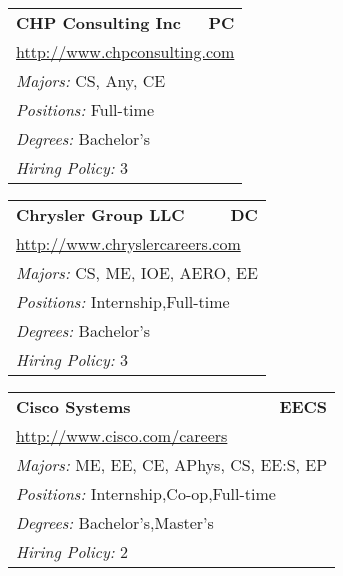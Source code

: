\documentclass[twoside]{article}
\begin{document}
\begin{center}
\begin{multicols}{3}
\begin{FlushLeft}
\begin{minipage}{.9\columnwidth}
\end{minipage}
 
\begin{minipage}{.9\columnwidth}\begin{tabularx}{.95\columnwidth}{Xr}
                 {\Large\bf CHP Consulting Inc} & {\Large\bf PC}\\
    \multicolumn{2}{p{.95\columnwidth}}{\url{http://www.chpconsulting.com}}\\
    \multicolumn{2}{p{.95\columnwidth}}{\emph{Majors:} CS, Any, CE}\\
    \multicolumn{2}{p{.95\columnwidth}}{\emph{Positions:} Full-time}\\
    \multicolumn{2}{p{.95\columnwidth}}{\emph{Degrees:} Bachelor's}\\
    \multicolumn{2}{p{.95\columnwidth}}{\emph{Hiring Policy:} 3}\\
    \end{tabularx}
    
\end{minipage}
 
\begin{minipage}{.9\columnwidth}\begin{tabularx}{.95\columnwidth}{Xr}
                 {\Large\bf Chrysler Group LLC} & {\Large\bf DC}\\
    \multicolumn{2}{p{.95\columnwidth}}{\url{http://www.chryslercareers.com}}\\
    \multicolumn{2}{p{.95\columnwidth}}{\emph{Majors:} CS, ME, IOE, AERO, EE}\\
    \multicolumn{2}{p{.95\columnwidth}}{\emph{Positions:} Internship,Full-time}\\
    \multicolumn{2}{p{.95\columnwidth}}{\emph{Degrees:} Bachelor's}\\
    \multicolumn{2}{p{.95\columnwidth}}{\emph{Hiring Policy:} 3}\\
    \end{tabularx}
    
\end{minipage}
 
\begin{minipage}{.9\columnwidth}\begin{tabularx}{.95\columnwidth}{Xr}
                 {\Large\bf Cisco Systems} & {\Large\bf EECS}\\
    \multicolumn{2}{p{.95\columnwidth}}{\url{http://www.cisco.com/careers}}\\
    \multicolumn{2}{p{.95\columnwidth}}{\emph{Majors:} ME, EE, CE, APhys, CS, EE:S, EP}\\
    \multicolumn{2}{p{.95\columnwidth}}{\emph{Positions:} Internship,Co-op,Full-time}\\
    \multicolumn{2}{p{.95\columnwidth}}{\emph{Degrees:} Bachelor's,Master's}\\
    \multicolumn{2}{p{.95\columnwidth}}{\emph{Hiring Policy:} 2}\\
    \end{tabularx}
    

\end{minipage}
\end{FlushLeft}
\end{multicols}
\end{center}
\end{document}

